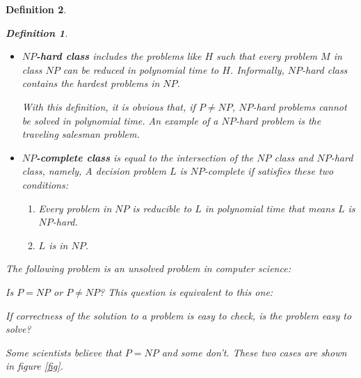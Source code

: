 \documentclass[12pt]{article}
\theoremstyle{slplain}
\newtheorem{defi}{Definition}
\begin{document}
\begin{defi}
\begin{defi}
\begin{itemize}
\item {\bf $NP$-hard class} includes the problems like $H$ such that every problem $M$ in class $NP$ can be reduced in polynomial time to $H$. Informally, $NP$-hard class contains the hardest problems in $NP$. 

With this definition, it is obvious that, if $P \not= NP$, $NP$-hard problems cannot be solved in polynomial time. An example of a $NP$-hard problem is the traveling salesman problem.\cite{lawler}

\item {\bf $NP$-complete class} is equal to the intersection of the $NP$ class and $NP$-hard class, namely, A decision problem $L$ is $NP$-complete if satisfies these two conditions:
\begin{enumerate}
\item Every problem in $NP$ is reducible to $L$ in polynomial time that means $L$ is $NP$-hard.

\item $L$ is in $NP$.
\end{enumerate}
\end{itemize}
\end{defi}


The following problem is an unsolved problem in computer science:

Is $P = NP$ or $P \not= NP$? This question is equivalent to this one: 

If correctness of the solution to a problem is easy to check, is the problem easy to solve? 

Some scientists believe that $P = NP$ and some don't. These two cases are shown in figure \ref{fig}.

\newcommand{\boundellipse}[3]%
{(#1) ellipse (#2 and #3)
}

\begin{figure}[!ht]
\centering


\end{figure}
\end{defi}
\end{document}
